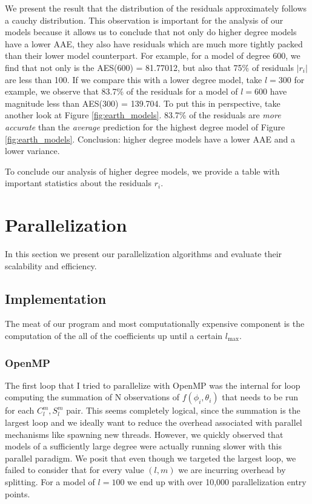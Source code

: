 \documentclass[a4paper]{article}
\theoremstyle{definition}
\begin{document}
We present the result that the distribution of the residuals approximately follows a cauchy distribution. This observation is important for the analysis of our 
models because it allows us to conclude that not only do higher degree models have a lower AAE, they also have residuals which are much more tightly packed than their
lower model counterpart. For example, for a model of degree 600, we find that not only is the AES(600) = 81.77012, but also that 75$\%$ of residuals $|r_i|$ are less
than 100. If we compare this with a lower degree model, take $l = 300$ for example, we observe that 83.7\% of the residuals for a model of $l = 600$ have magnitude less 
than AES(300) = 139.704. To put this in perspective, take another look at Figure \ref{fig:earth_models}. 83.7\% of the residuals are \textit{more accurate} than the \textit{average}
prediction for the highest degree model of Figure \ref{fig:earth_models}. Conclusion: higher degree models have a lower AAE and a lower variance.

To conclude our analysis of higher degree models, we provide a table with important statistics about the residuals $r_i$.

\section{Parallelization} 

In this section we present our parallelization algorithms and evaluate their scalability and efficiency. 

\subsection{Implementation}

The meat of our program and most computationally expensive component is the computation of the all of the coefficients up until a certain $l_{\mathrm{max}}$. 

\subsubsection{OpenMP}

The first loop that I tried to parallelize with OpenMP was the internal for loop computing the summation of N observations of $f(\phi_i, \theta_i)$ that needs to be run for each $C_l^m, S_l^m$ pair. 
This seems completely logical, since the summation is the largest loop and we ideally want to reduce the overhead associated with parallel mechanisms like spawning new threads. 
However, we quickly observed that models of a sufficiently large degree were actually running slower with this parallel paradigm. We posit that even though we targeted the largest loop,
we failed to consider that for every value $(l, m)$ we are incurring overhead by splitting. For a model of $l = 100$ we end up with over 10,000 parallelization entry points.
\end{document}
